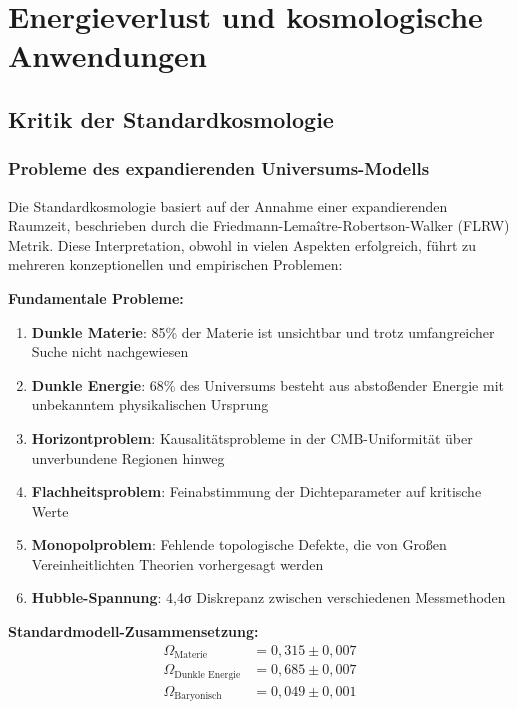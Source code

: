 \documentclass[12pt,a4paper]{report}
\begin{document}
	\chapter{Energieverlust und kosmologische Anwendungen}
	\label{chap:cosmology}
	
	\section{Kritik der Standardkosmologie}
	\label{sec:critique_standard_cosmology}
	
	\subsection{Probleme des expandierenden Universums-Modells}
	\label{subsec:problems_space_expansion}
	
	Die Standardkosmologie basiert auf der Annahme einer expandierenden Raumzeit, beschrieben durch die Friedmann-Lemaître-Robertson-Walker (FLRW) Metrik. Diese Interpretation, obwohl in vielen Aspekten erfolgreich, führt zu mehreren konzeptionellen und empirischen Problemen:
	
	\textbf{Fundamentale Probleme:}
	\begin{enumerate}
		\item \textbf{Dunkle Materie}: 85\% der Materie ist unsichtbar und trotz umfangreicher Suche nicht nachgewiesen
		\item \textbf{Dunkle Energie}: 68\% des Universums besteht aus abstoßender Energie mit unbekanntem physikalischen Ursprung
		\item \textbf{Horizontproblem}: Kausalitätsprobleme in der CMB-Uniformität über unverbundene Regionen hinweg
		\item \textbf{Flachheitsproblem}: Feinabstimmung der Dichteparameter auf kritische Werte
		\item \textbf{Monopolproblem}: Fehlende topologische Defekte, die von Großen Vereinheitlichten Theorien vorhergesagt werden
		\item \textbf{Hubble-Spannung}: 4,4σ Diskrepanz zwischen verschiedenen Messmethoden
	\end{enumerate}
	
	\textbf{Standardmodell-Zusammensetzung:}
	\begin{align}
		\Omega_{\text{Materie}} &= 0,315 \pm 0,007 \\
		\Omega_{\text{Dunkle Energie}} &= 0,685 \pm 0,007 \\
		\Omega_{\text{Baryonisch}} &= 0,049 \pm 0,001
	\end{align}
	
\end{document}
